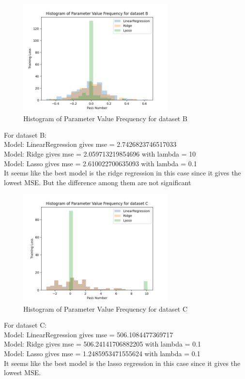 \documentclass[10pt,letter,notitlepage]{article}
\newcounter{exercise}
\begin{document}
\begin{exercise}
{    \begin{figure}[H]
    \centering
    \includegraphics[width=0.7\textwidth]{Exercise3_dataset_B.png}
    \caption{Histogram of Parameter Value Frequency for dataset B}
    \end{figure}

    For dataset B: \\
    \color{orange}
    Model: LinearRegression gives mse = 2.7426823746517033 \\
    Model: Ridge gives mse = 2.059713219854696 with lambda = 10 \\
    Model: Lasso gives mse = 2.610022700635093 with lambda = 0.1 \\
    It seems like the best model is the ridge regression in this case since it gives the lowest MSE. But the difference
    among them are not significant\\
    \begin{figure}[H]
    \centering
    \includegraphics[width=0.7\textwidth]{Exercise3_dataset_C.png}
    \caption{Histogram of Parameter Value Frequency for dataset C}
    \end{figure}
    For dataset C: \\
    Model: LinearRegression gives mse = 506.1084477369717   \\
    Model: Ridge gives mse = 506.24141706882205 with lambda = 0.1 \\
    Model: Lasso gives mse = 1.2485953471555624 with lambda = 0.1 \\
    It seems like the best model is the lasso regression in this case since it gives the lowest MSE.\\
  }
\end{exercise}
\end{document}

